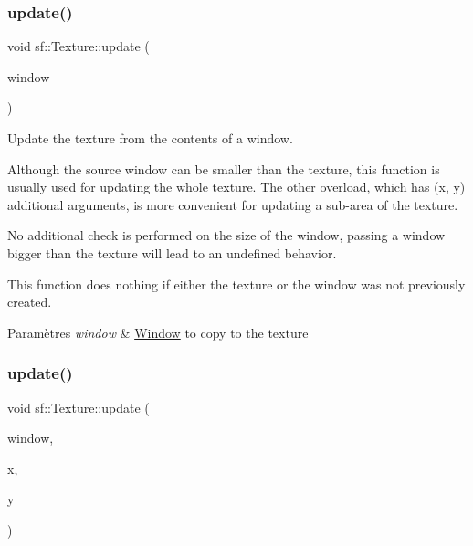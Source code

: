 \subsubsection{\texorpdfstring{update()}{update()}\hspace{0.1cm}{\footnotesize\ttfamily [5/6]}}
{\footnotesize\ttfamily void sf\+::\+Texture\+::update (\begin{DoxyParamCaption}\item[{const \hyperlink{classsf_1_1Window}{Window} \&}]{window }\end{DoxyParamCaption})}



Update the texture from the contents of a window. 

Although the source window can be smaller than the texture, this function is usually used for updating the whole texture. The other overload, which has (x, y) additional arguments, is more convenient for updating a sub-\/area of the texture.

No additional check is performed on the size of the window, passing a window bigger than the texture will lead to an undefined behavior.

This function does nothing if either the texture or the window was not previously created.


\begin{DoxyParams}{Paramètres}
{\em window} & \hyperlink{classsf_1_1Window}{Window} to copy to the texture \\
\hline
\end{DoxyParams}
\mbox{\label{classsf_1_1Texture_a154f246eb8059b602076009ab1cfd175}} 
\subsubsection{\texorpdfstring{update()}{update()}\hspace{0.1cm}{\footnotesize\ttfamily [6/6]}}
{\footnotesize\ttfamily void sf\+::\+Texture\+::update (\begin{DoxyParamCaption}\item[{const \hyperlink{classsf_1_1Window}{Window} \&}]{window,  }\item[{unsigned int}]{x,  }\item[{unsigned int}]{y }\end{DoxyParamCaption})}



